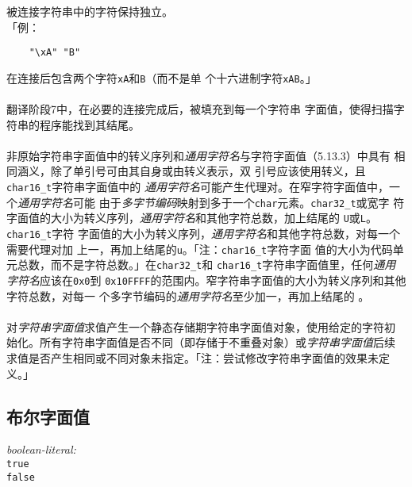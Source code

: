 \noindent 被连接字符串中的字符保持独立。                                      \\
「例：
\begin{lstlisting}
	"\xA" "B"
\end{lstlisting}
在连接后包含两个字符\texttt{\qsgl\bslh xA\qsgl}和\texttt{\qsgl B\qsgl}（而不是单
个十六进制字符\texttt{\qsgl\bslh xAB\qsgl}。」

\paragraph{}
翻译阶段7中，在必要的连接完成后，\texttt{\qsgl{}\qsgl}被填充到每一个字符串
字面值，使得扫描字符串的程序能找到其结尾。

\paragraph{}
非原始字符串字面值中的转义序列和\textit{通用字符名}与字符字面值（5.13.3）中具有
相同涵义，除了单引号\texttt{\qsgl}可由其自身或由转义\texttt{\bslh\qsgl}表示，双
引号应该使用\textit{\bslh}转义，且\texttt{char16\_t}字符串字面值中的
\textit{通用字符名}可能产生代理对。在窄字符字面值中，一个\textit{通用字符名}可能
由于\textit{多字节编码}映射到多于一个\texttt{char}元素。\texttt{char32\_t}或宽字
符字面值的大小为转义序列，\textit{通用字符名}和其他字符总数，加上结尾的
\texttt{U\qsgl{}\qsgl}或\texttt{L\qsgl{}\qsgl}。\texttt{char16\_t}字符
字面值的大小为转义序列，\textit{通用字符名}和其他字符总数，对每一个需要代理对加
上一，再加上结尾的\texttt{u\qsgl{}\qsgl}。「注：\texttt{char16\_t}字符字面
值的大小为代码单元总数，而不是字符总数。」在\texttt{char32\_t}和
\texttt{char16\_t}字符串字面值里，任何\textit{通用字符名}应该在\texttt{0x0}到
\texttt{0x10FFFF}的范围内。窄字符串字面值的大小为转义序列和其他字符总数，对每一
个多字节编码的\textit{通用字符名}至少加一，再加上结尾的
\texttt{\qsgl{}\qsgl}。

\paragraph{}
对\textit{字符串字面值}求值产生一个静态存储期字符串字面值对象，使用给定的字符初
始化。所有字符串字面值是否不同（即存储于不重叠对象）或\textit{字符串字面值}后续
求值是否产生相同或不同对象未指定。「注：尝试修改字符串字面值的效果未定义。」

\subsection{布尔字面值}
\noindent \mbox{\qquad \textit{boolean-literal:}}                             \\
\mbox{\qquad \qquad \texttt{true}}                                            \\
\mbox{\qquad \qquad \texttt{false}}

